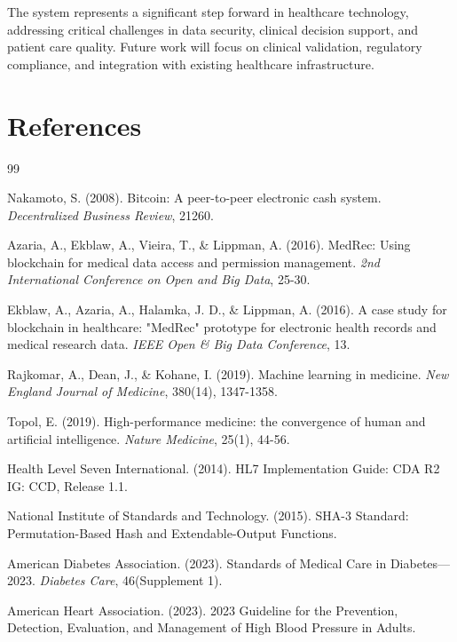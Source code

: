 \documentclass[12pt,a4paper]{article}
\begin{document}
The system represents a significant step forward in healthcare technology, addressing critical challenges in data security, clinical decision support, and patient care quality. Future work will focus on clinical validation, regulatory compliance, and integration with existing healthcare infrastructure.

\section{References}

\begin{thebibliography}{99}

 Nakamoto, S. (2008). Bitcoin: A peer-to-peer electronic cash system. \textit{Decentralized Business Review}, 21260.

 Azaria, A., Ekblaw, A., Vieira, T., \& Lippman, A. (2016). MedRec: Using blockchain for medical data access and permission management. \textit{2nd International Conference on Open and Big Data}, 25-30.

 Ekblaw, A., Azaria, A., Halamka, J. D., \& Lippman, A. (2016). A case study for blockchain in healthcare: "MedRec" prototype for electronic health records and medical research data. \textit{IEEE Open \& Big Data Conference}, 13.

 Rajkomar, A., Dean, J., \& Kohane, I. (2019). Machine learning in medicine. \textit{New England Journal of Medicine}, 380(14), 1347-1358.

 Topol, E. (2019). High-performance medicine: the convergence of human and artificial intelligence. \textit{Nature Medicine}, 25(1), 44-56.

 Health Level Seven International. (2014). HL7 Implementation Guide: CDA\textregistered{} R2 IG: CCD, Release 1.1.

 National Institute of Standards and Technology. (2015). SHA-3 Standard: Permutation-Based Hash and Extendable-Output Functions.

 American Diabetes Association. (2023). Standards of Medical Care in Diabetes—2023. \textit{Diabetes Care}, 46(Supplement 1).

 American Heart Association. (2023). 2023 Guideline for the Prevention, Detection, Evaluation, and Management of High Blood Pressure in Adults.

\end{thebibliography}
\end{document}
